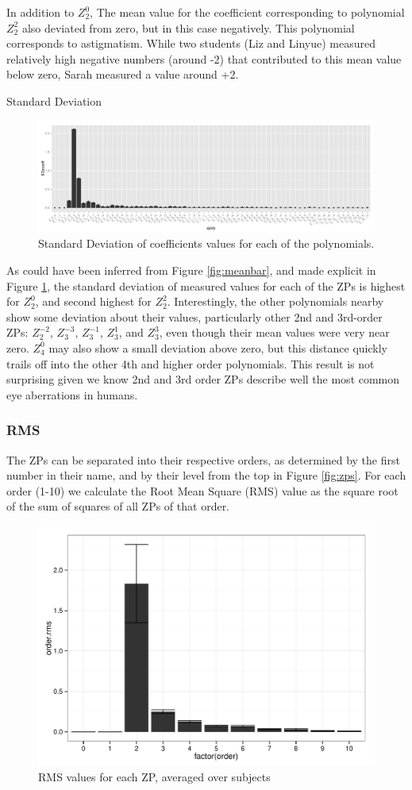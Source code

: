 \documentclass{article}
\begin{document}
In addition to $Z_2^0$, The mean value for the coefficient corresponding to polynomial $Z_2^2$ also deviated from zero, but in this case negatively. This polynomial corresponds to astigmatism. While two students (Liz and Linyue) measured relatively high negative numbers (around -2) that contributed to this mean value below zero, Sarah measured a value around +2.\

Standard Deviation

\begin{figure}[h]
  \centering
    \includegraphics[width=1\textwidth]{stdbar.pdf}
  \caption{Standard Deviation of coefficients values for each of the polynomials.}
  \label{fig:sdbar}
\end{figure}

As could have been inferred from Figure \ref{fig:meanbar}, and made explicit in Figure \ref{fig:sdbar}, the standard deviation of measured values for each of the ZPs is highest for $Z_2^0$, and second highest for $Z_2^2$. Interestingly, the other polynomials nearby show some deviation about their values, particularly other 2nd and 3rd-order ZPs: $Z_2^{-2}$, $Z_3^{-3}$, $Z_3^{-1}$, $Z_3^1$, and $Z_3^3$, even though their mean values were very near zero. $Z_4^0$ may also show a small deviation above zero, but this distance quickly trails off into the other 4th and higher order polynomials. This result is not surprising given we know 2nd and 3rd order ZPs describe well the most common eye aberrations in humans.\

\subsubsection{RMS}

The ZPs can be separated into their respective orders, as determined by the first number in their name, and by their level from the top in Figure \ref{fig:zps}. For each order (1-10) we calculate the Root Mean Square (RMS) value as the square root of the sum of squares of all ZPs of that order. 

\begin{figure}[H]
  \centering
    \includegraphics[width=.5\textwidth]{orderrms.pdf}
  \caption{RMS values for each ZP, averaged over subjects}
  \label{fig:rmsbar}
\end{figure}
\end{document}
